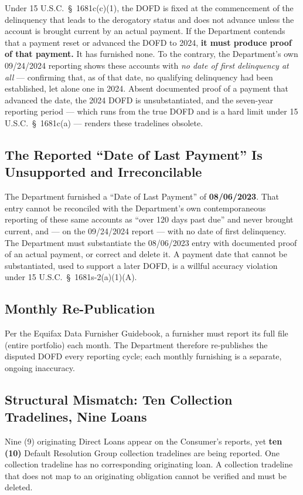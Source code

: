 Under 15 U.S.C.\ \S~1681c(c)(1), the DOFD is fixed at the commencement of the delinquency that leads to the derogatory status and does not advance unless the account is brought current by an actual payment. If the Department contends that a payment reset or advanced the DOFD to 2024, \textbf{it must produce proof of that payment.} It has furnished none. To the contrary, the Department's own 09/24/2024 reporting shows these accounts with \emph{no date of first delinquency at all} --- confirming that, as of that date, no qualifying delinquency had been established, let alone one in 2024. Absent documented proof of a payment that advanced the date, the 2024 DOFD is unsubstantiated, and the seven-year reporting period --- which runs from the true DOFD and is a hard limit under 15 U.S.C.\ \S~1681c(a) --- renders these tradelines obsolete.

\subsection*{The Reported ``Date of Last Payment'' Is Unsupported and Irreconcilable}

The Department furnished a ``Date of Last Payment'' of \textbf{08/06/2023}. That entry cannot be reconciled with the Department's own contemporaneous reporting of these same accounts as ``over 120 days past due'' and never brought current, and --- on the 09/24/2024 report --- with no date of first delinquency. The Department must substantiate the 08/06/2023 entry with documented proof of an actual payment, or correct and delete it. A payment date that cannot be substantiated, used to support a later DOFD, is a willful accuracy violation under 15 U.S.C.\ \S~1681s-2(a)(1)(A).

\subsection*{Monthly Re-Publication}

Per the Equifax Data Furnisher Guidebook, a furnisher must report its full file (entire portfolio) each month. The Department therefore re-publishes the disputed DOFD every reporting cycle; each monthly furnishing is a separate, ongoing inaccuracy.

\subsection*{Structural Mismatch: Ten Collection Tradelines, Nine Loans}

Nine (9) originating Direct Loans appear on the Consumer's reports, yet \textbf{ten (10)} Default Resolution Group collection tradelines are being reported. One collection tradeline has no corresponding originating loan. A collection tradeline that does not map to an originating obligation cannot be verified and must be deleted.

